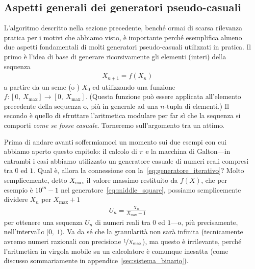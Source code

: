 \begin{snippet}[htb!]
  \bigskip %
\end{snippet}


\subsection{Aspetti generali dei generatori pseudo-casuali}

L'algoritmo  descritto nella sezione precedente, benché
ormai di scarsa rilevanza pratica per i motivi che abbiamo visto, è
importante perché esemplifica almeno due aspetti fondamentali di molti
generatori pseudo-casuali utilizzati in pratica. Il primo è l'idea
di base di generare ricorsivamente gli elementi (interi) della sequenza
\begin{align}\label{eq:generatore_iterativo}
  X_{n + 1} = f(X_n)
\end{align}
a partire da un seme (o ) $X_0$ ed utilizzando una funzione
$f: [0,~X_\text{max}] \rightarrow [0,~X_\text{max}]$. (Questa funzione può
essere applicata all'elemento precedente della sequenza o, più in generale
ad una $n$-tupla di elementi.) Il secondo è quello di sfruttare
l'aritmetica modulare per far sì che la sequenza si comporti
\emph{come se fosse casuale}. Torneremo sull'argomento tra un attimo.

Prima di andare avanti soffermiamoci un momento sui due esempi con cui abbiamo
aperto questo capitolo: il calcolo di $\pi$ e la macchina di Galton---in
entrambi i casi abbiamo utilizzato un generatore casuale di numeri reali
compresi tra $0$ ed $1$. Qual è, allora la connessione con
la~\eqref{eq:generatore_iterativo}?
Molto semplicemente, detto $X_\text{max}$ il valore massimo restituito da $f(X)$,
che per esempio è $10^m - 1$ nel generatore~\eqref{eq:middle_square},
possiamo semplicemente dividere $X_n$ per $X_\text{max} + 1$
\begin{align}
  U_n = \frac{X_n}{X_\text{max} + 1}
\end{align}
per ottenere una sequenza $U_n$ di numeri reali tra $0$ ed $1$---o, più
precisamente, nell'intervallo $[0,~1)$. Va da sé che la granularità non
sarà infinita (tecnicamente avremo numeri razionali con precisione
$\nicefrac{1}{X_\text{max}}$), ma questo è irrilevante, perché
l'aritmetica in virgola mobile su un calcolatore è comunque inesatta (come
discusso sommariamente in appendice~\ref{sec:sistema_binario}).

